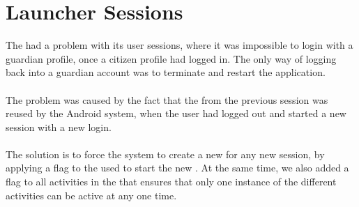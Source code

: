
\section{Launcher Sessions}
\label{sec:launcher_session_issues}

The \launcher had a problem with its user sessions, where it was impossible to login with a guardian profile, once a citizen profile had logged in. The only way of logging back into a guardian account was to terminate and restart the application.
\\\\
The problem was caused by the fact that the  from the previous session was reused by the Android system, when the user had logged out and started a new session with a new login.
\\\\
The solution is to force the system to create a new  for any new session, by applying a flag to the  used to start the new . At the same time, we also added a flag to all activities in the \launcher that ensures that only one instance of the different activities can be active at any one time.

